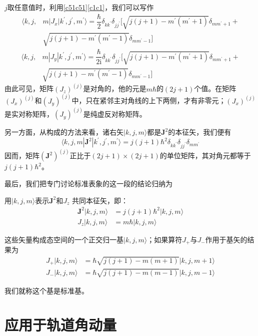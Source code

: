 \documentclass[]{article}
\begin{document}
$j$取任意值时，利用\eqref{c51c51}\eqref{c1c1}，我们可以写作
\begin{align}
	\langle k,j,&m|J_x|k^\prime,j^\prime,m^\prime\rangle=\dfrac{\hbar}{2}\delta_{kk^\prime}\delta_{jj^\prime}[\sqrt{j(j+1)-m^\prime(m^\prime+1)}\delta_{mm^\prime+1}+\nonumber\\
	&\sqrt{j(j+1)-m^\prime(m^\prime-1)}\delta_{mm^\prime-1}]
\end{align}
\begin{align}
	\langle k,j,&m|J_y|k^\prime,j^\prime,m^\prime\rangle=\dfrac{\hbar}{2\mathrm{i}}\delta_{kk^\prime}\delta_{jj^\prime}[\sqrt{j(j+1)-m^\prime(m^\prime+1)}\delta_{mm^\prime+1}+\nonumber\\
	&\sqrt{j(j+1)-m^\prime(m^\prime-1)}\delta_{mm^\prime-1}]
\end{align}
由此可见，矩阵$(J_z)^{(j)}$是对角的，他的元是$m\hbar$的$(2j+1)$个值。在矩阵$(J_x)^{(j)}$和$(J_y)^{(j)}$中，只在紧邻主对角线的上下两侧，才有非零元；$(J_x)^{(j)}$是实对称矩阵，$(J_y)^{(j)}$是纯虚反对称矩阵。\par 
另一方面，从构成的方法来看，诸右矢$|k,j,m\rangle$都是$\boldsymbol{J}^2$的本征矢，我们便有
\begin{equation}
	\langle k,j,m|\boldsymbol{J}^2|k^\prime,j^\prime,m^\prime\rangle=j(j+1)\hbar^2\delta_{kk^\prime}\delta_{jj^\prime}\delta_{mm^\prime}
\end{equation}
因而，矩阵$(\boldsymbol{J}^2)^{(j)}$正比于$(2j+1)\times(2j+1)$的单位矩阵，其对角元都等于$j(j+1)\hbar^2$。\par 
最后，我们把专门讨论标准表象的这一段的结论归纳为\par 
用$|k,j,m\rangle$表示$\boldsymbol{J}^2$和$J_z$ 共同本征矢，即：
\begin{align}
	\boldsymbol{J}^2|k,j,m\rangle&=j(j+1)\hbar^2|k,j,m\rangle\nonumber\\
	J_z|k,j,m\rangle&=m\hbar|k,j,m\rangle\nonumber
\end{align}

这些矢量构成态空间的一个正交归一基${|k,j,m\rangle}$；如果算符$J_+$与$J_-$作用于基矢的结果为
\begin{align}
	J_+|k,j,m\rangle&=\hbar\sqrt{j(j+1)-m(m+1)}|k,j,m+1\rangle\nonumber\\
	J_-|k,j,m\rangle&=\hbar\sqrt{j(j+1)-m(m-1)}|k,j,m-1\rangle\nonumber
\end{align}

我们就称这个基是标准基。
\section{应用于轨道角动量}
\end{document}
